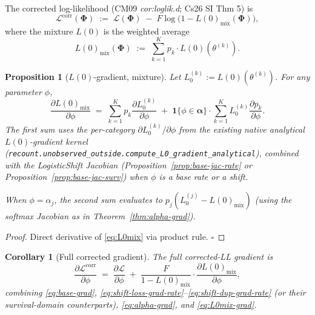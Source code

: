 \documentclass[11pt]{article}
\newcommand{\Ll}{\mathcal{L}}
\newtheorem{proposition}[theorem]{Proposition}
\newtheorem{corollary}[theorem]{Corollary}
\theoremstyle{definition}
\begin{document}
The corrected log-likelihood (CM09 \emph{cor:loglik.d}; Cs26 SI Thm 5)
is
\begin{equation}
\Ll^{\mathrm{corr}}(\bm\Phi)
\;:=\;
\Ll(\bm\Phi) \;-\; F \log\bigl(1 - L(0)_{\mathrm{mix}}(\bm\Phi)\bigr),
\label{eq:Lcorr}
\end{equation}
where the mixture $L(0)$ is the weighted average
\begin{equation}
L(0)_{\mathrm{mix}}(\bm\Phi)
\;:=\;
\sum_{k=1}^K p_k \cdot L(0)(\theta^{(k)}).
\label{eq:L0mix}
\end{equation}

\begin{proposition}[$L(0)$-gradient, mixture]\label{prop:L0-grad}
Let $L_0^{(k)} := L(0)(\theta^{(k)})$. For any parameter $\phi$,
\begin{equation}
\frac{\partial L(0)_{\mathrm{mix}}}{\partial \phi}
\;=\;
\sum_{k=1}^K p_k\frac{\partial L_0^{(k)}}{\partial \phi}
\;+\; \mathbf{1}\{\phi \in \bm\alpha\} \cdot
      \sum_{k=1}^K L_0^{(k)}\frac{\partial p_k}{\partial \phi}.
\label{eq:L0mix-grad}
\end{equation}
The first sum uses the per-category $\partial L_0^{(k)}/\partial \phi$
from the existing native analytical $L(0)$-gradient kernel
(\texttt{recount.unobserved\_outside.compute\_L0\_gradient\_analytical}),
combined with the LogisticShift Jacobian
(Proposition~\ref{prop:base-jac-rate} or
Proposition~\ref{prop:base-jac-surv}) when $\phi$ is a base rate or a
shift.

When $\phi = \alpha_j$, the second sum evaluates to
$p_j(L_0^{(j)} - L(0)_{\mathrm{mix}})$ (using the softmax Jacobian
as in Theorem~\ref{thm:alpha-grad}).
\end{proposition}
\begin{proof}
Direct derivative of \eqref{eq:L0mix} via product rule. $\square$
\end{proof}

\begin{corollary}[Full corrected gradient]\label{cor:full-grad}
The full corrected-LL gradient is
\begin{equation}
\frac{\partial \Ll^{\mathrm{corr}}}{\partial \phi}
\;=\;
\frac{\partial \Ll}{\partial \phi}
\;+\;
\frac{F}{1 - L(0)_{\mathrm{mix}}}
\cdot \frac{\partial L(0)_{\mathrm{mix}}}{\partial \phi},
\label{eq:corr-grad}
\end{equation}
combining \eqref{eq:base-grad},
\eqref{eq:shift-loss-grad-rate}--\eqref{eq:shift-dup-grad-rate}
(or their survival-domain counterparts),
\eqref{eq:alpha-grad}, and \eqref{eq:L0mix-grad}.
\end{corollary}
\end{document}
